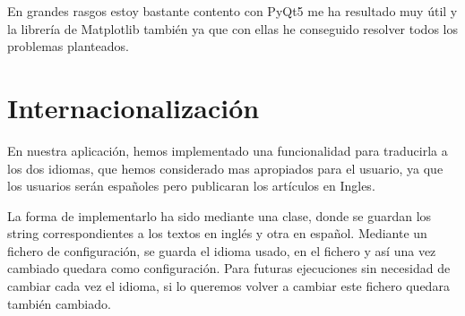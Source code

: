 En grandes rasgos estoy bastante contento con PyQt5 me ha resultado muy útil y la librería de Matplotlib también ya que con ellas he conseguido resolver todos los problemas planteados.

\section{Internacionalización}

En nuestra aplicación, hemos implementado una funcionalidad para traducirla a los dos idiomas, que hemos considerado mas apropiados para el usuario, ya que los usuarios serán españoles pero publicaran los artículos en Ingles.

La forma de implementarlo ha sido mediante una clase, donde se guardan los string correspondientes a los textos en inglés y otra en español. Mediante un fichero de configuración, se guarda el idioma usado, en el fichero y así una vez cambiado quedara como configuración. Para futuras ejecuciones sin necesidad de cambiar cada vez el idioma, si lo queremos volver a cambiar este fichero quedara también cambiado.